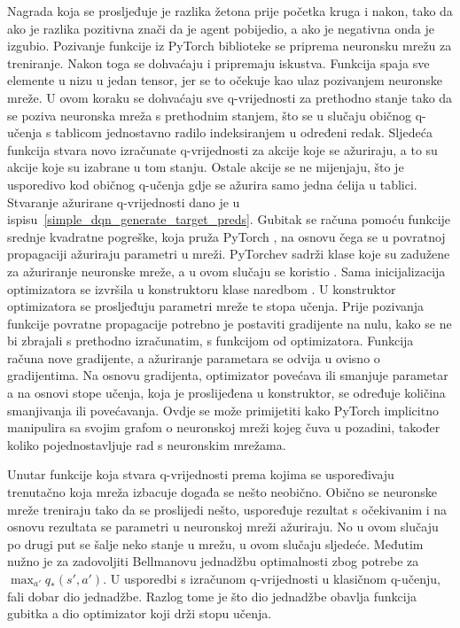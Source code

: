 Nagrada koja se prosljeđuje je razlika žetona prije početka kruga i nakon, tako da ako je razlika pozitivna znači da je agent pobijedio, a ako je negativna onda je izgubio. Pozivanje funkcije  iz PyTorch biblioteke se priprema neuronsku mrežu za treniranje. Nakon toga se dohvaćaju i pripremaju iskustva. Funkcija  spaja sve elemente u nizu u jedan tensor, jer se to očekuje kao ulaz pozivanjem neuronske mreže. U ovom koraku se dohvaćaju sve q-vrijednosti za prethodno stanje tako da se poziva neuronska mreža s prethodnim stanjem, što se u slučaju običnog q-učenja s tablicom jednostavno radilo indeksiranjem u određeni redak. Sljedeća funkcija  stvara novo izračunate q-vrijednosti za akcije koje se ažuriraju, a to su akcije koje su izabrane u tom stanju. Ostale akcije se ne mijenjaju, što je usporedivo kod običnog q-učenja gdje se ažurira samo jedna ćelija u tablici. Stvaranje ažurirane q-vrijednosti dano je u ispisu~\ref{simple_dqn_generate_target_preds}. Gubitak se računa pomoću funkcije srednje kvadratne pogreške, koja pruža PyTorch , na osnovu čega se u povratnoj propagaciji ažuriraju parametri u mreži. PyTorchev  sadrži klase koje su zadužene za ažuriranje neuronske mreže, a u ovom slučaju se koristio . Sama inicijalizacija optimizatora se izvršila u konstruktoru klase naredbom . U konstruktor optimizatora se prosljeđuju parametri mreže te stopa učenja. Prije pozivanja funkcije povratne propagacije potrebno je postaviti gradijente na nulu, kako se ne bi zbrajali s prethodno izračunatim, s funkcijom  od optimizatora. Funkcija  računa nove gradijente, a ažuriranje parametara se odvija u  ovisno o gradijentima. Na osnovu gradijenta, optimizator povećava ili smanjuje parametar a na osnovi stope učenja, koja je proslijeđena u konstruktor, se određuje količina smanjivanja ili povećavanja. Ovdje se može primijetiti kako PyTorch implicitno manipulira sa svojim grafom o neuronskoj mreži kojeg čuva u pozadini, također koliko pojednostavljuje rad s neuronskim mrežama.


Unutar funkcije koja stvara q-vrijednosti prema kojima se uspoređivaju trenutačno koja mreža izbacuje događa se nešto neobično. Obično se neuronske mreže treniraju tako da se proslijedi nešto, uspoređuje rezultat s očekivanim i na osnovu rezultata se parametri u neuronskoj mreži ažuriraju. No u ovom slučaju po drugi put se šalje neko stanje u mrežu, u ovom slučaju sljedeće. Međutim nužno je za zadovoljiti Bellmanovu jednadžbu optimalnosti zbog potrebe za $\max_{a'}q_*(s', a')$. U usporedbi s izračunom q-vrijednosti u klasičnom q-učenju, fali dobar dio jednadžbe. Razlog tome je što dio jednadžbe obavlja funkcija gubitka a dio optimizator koji drži stopu učenja.

